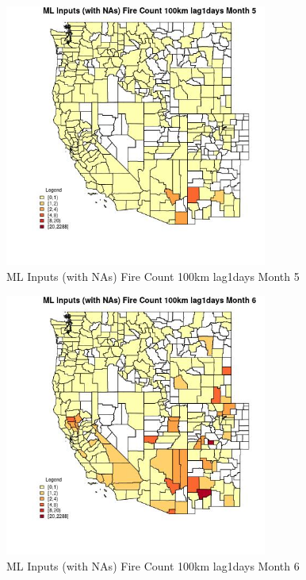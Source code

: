\begin{figure} 
\centering  
\includegraphics[width=0.77\textwidth]{Code_Outputs/Report_ML_input_PM25_Step4_part_e_de_duplicated_aves_compiled_2019-05-20wNAs_CountyFire_Count_100km_lag1daysmedianMonth5.jpg} 
\caption{\label{fig:Report_ML_input_PM25_Step4_part_e_de_duplicated_aves_compiled_2019-05-20wNAsCountyFire_Count_100km_lag1daysmedianMonth5}ML Inputs (with NAs) Fire Count 100km lag1days Month 5} 
\end{figure} 
 

\begin{figure} 
\centering  
\includegraphics[width=0.77\textwidth]{Code_Outputs/Report_ML_input_PM25_Step4_part_e_de_duplicated_aves_compiled_2019-05-20wNAs_CountyFire_Count_100km_lag1daysmedianMonth6.jpg} 
\caption{\label{fig:Report_ML_input_PM25_Step4_part_e_de_duplicated_aves_compiled_2019-05-20wNAsCountyFire_Count_100km_lag1daysmedianMonth6}ML Inputs (with NAs) Fire Count 100km lag1days Month 6} 
\end{figure} 
 


